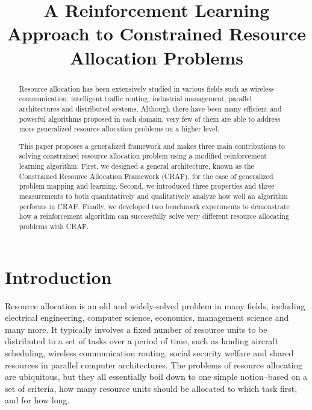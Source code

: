 \documentclass[conference]{IEEEtran}
\begin{document}
\onehalfspacing
\title{A Reinforcement Learning Approach to Constrained Resource Allocation Problems}

\author{
}
\maketitle

\begin{abstract}
Resource allocation has been extensively studied in various fields such as wireless communication, intelligent traffic routing, industrial management, parallel architectures and distributed systems. Although there have been many efficient and powerful algorithms proposed in each domain, very few of them are able to address more generalized resource allocation problems on a higher level.
	
This paper proposes a generalized framework and makes three main contributions to solving constrained resource allocation problem using a modified reinforcement learning algorithm. First, we designed a general architecture, known as the Constrained Resource Allocation Framework (CRAF), for the ease of generalized problem mapping and learning. Second, we introduced three properties and three measurements to both quantitatively and qualitatively analyze how well an algorithm performs in CRAF. Finally, we developed two benchmark experiments to demonstrate how a reinforcement algorithm can successfully solve very different resource allocating problems with CRAF.
\end{abstract}

\section{Introduction}
Resource allocation is an old and widely-solved problem in many fields, including electrical engineering, computer science, economics, management science and many more. It typically involves a fixed number of resource units to be distributed to a set of tasks over a period of time, such as landing aircraft scheduling, wireless communication routing, social security welfare and shared resources in parallel computer architectures. The problems of resource allocating are ubiquitous, but they all essentially boil down to one simple notion--based on a set of criteria, how many resource units should be allocated to which task first, and for how long.
\end{document}
